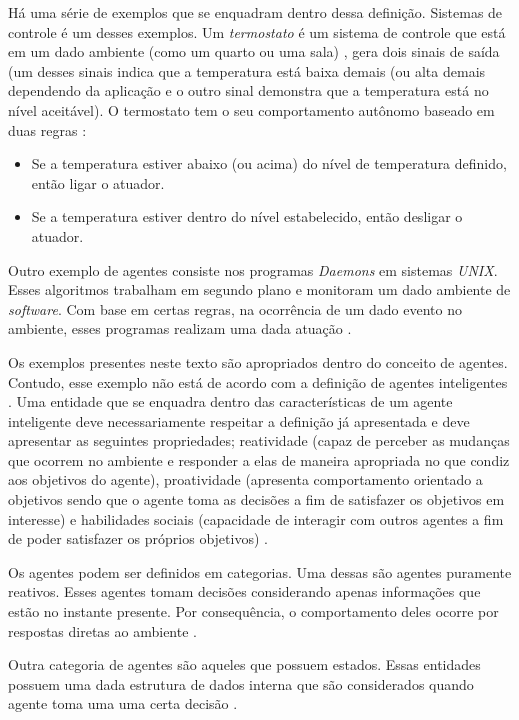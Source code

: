Há uma série de exemplos que se enquadram dentro dessa definição. Sistemas de controle é um desses exemplos. Um \textit{termostato} é um sistema de controle que está em um dado ambiente (como um quarto ou uma sala) \cite{whatisagent}, gera dois sinais de saída (um desses sinais indica que a temperatura está baixa demais (ou alta demais dependendo da aplicação e o outro sinal
demonstra que a temperatura está no nível aceitável). O termostato tem o seu comportamento autônomo baseado em duas regras \cite{whatisagent}:

\begin{itemize}
    \item Se a temperatura estiver abaixo (ou acima) do nível de temperatura definido, então ligar o atuador.
    \item Se a temperatura estiver dentro do nível estabelecido, então desligar o atuador.
\end{itemize}

Outro exemplo de agentes consiste nos programas \textit{Daemons} em sistemas \textit{UNIX}. Esses algoritmos trabalham em segundo plano e monitoram um dado ambiente de \textit{software}. Com base em certas regras, na ocorrência de um dado evento no ambiente, esses programas realizam uma dada atuação \cite{whatisagent}.   

Os exemplos presentes neste texto são apropriados dentro do conceito de agentes. Contudo, esse exemplo não está de acordo com a definição de agentes inteligentes \cite{whatisagent}. Uma entidade que se enquadra dentro das características de um agente inteligente deve necessariamente respeitar a definição já apresentada e deve apresentar as seguintes propriedades; reatividade (capaz de perceber as mudanças
que ocorrem no ambiente e responder a elas de maneira apropriada no que condiz aos objetivos do agente), proatividade (apresenta comportamento orientado a objetivos sendo que o agente toma as decisões a fim de satisfazer os objetivos em interesse) e habilidades sociais (capacidade de interagir com outros agentes a fim de poder satisfazer os próprios objetivos) \cite{whatisagent} \cite{artificialinteligencemodermapproach}.

Os agentes podem ser definidos em categorias. Uma dessas são agentes puramente reativos. Esses agentes tomam decisões considerando apenas informações que estão no instante presente. Por consequência, o comportamento deles ocorre por respostas diretas ao ambiente \cite{whatisagent}. 

Outra categoria de agentes são aqueles que possuem estados. Essas entidades possuem uma dada estrutura de dados interna que são considerados quando agente toma uma uma certa decisão \cite{whatisagent}.

